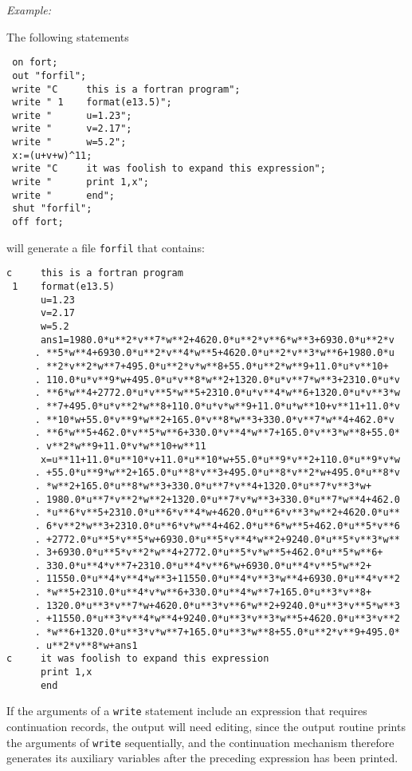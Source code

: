 \textit{Example:}

The following {\REDUCE} statements
\begin{verbatim}
 on fort;
 out "forfil";
 write "C     this is a fortran program";
 write " 1    format(e13.5)";
 write "      u=1.23";
 write "      v=2.17";
 write "      w=5.2";
 x:=(u+v+w)^11;
 write "C     it was foolish to expand this expression";
 write "      print 1,x";
 write "      end";
 shut "forfil";
 off fort;
\end{verbatim}
will generate a file \texttt{forfil} that contains:

{\scriptsize
\begin{verbatim}
c     this is a fortran program
 1    format(e13.5)
      u=1.23
      v=2.17
      w=5.2
      ans1=1980.0*u**2*v**7*w**2+4620.0*u**2*v**6*w**3+6930.0*u**2*v
     . **5*w**4+6930.0*u**2*v**4*w**5+4620.0*u**2*v**3*w**6+1980.0*u
     . **2*v**2*w**7+495.0*u**2*v*w**8+55.0*u**2*w**9+11.0*u*v**10+
     . 110.0*u*v**9*w+495.0*u*v**8*w**2+1320.0*u*v**7*w**3+2310.0*u*v
     . **6*w**4+2772.0*u*v**5*w**5+2310.0*u*v**4*w**6+1320.0*u*v**3*w
     . **7+495.0*u*v**2*w**8+110.0*u*v*w**9+11.0*u*w**10+v**11+11.0*v
     . **10*w+55.0*v**9*w**2+165.0*v**8*w**3+330.0*v**7*w**4+462.0*v
     . **6*w**5+462.0*v**5*w**6+330.0*v**4*w**7+165.0*v**3*w**8+55.0*
     . v**2*w**9+11.0*v*w**10+w**11
      x=u**11+11.0*u**10*v+11.0*u**10*w+55.0*u**9*v**2+110.0*u**9*v*w
     . +55.0*u**9*w**2+165.0*u**8*v**3+495.0*u**8*v**2*w+495.0*u**8*v
     . *w**2+165.0*u**8*w**3+330.0*u**7*v**4+1320.0*u**7*v**3*w+
     . 1980.0*u**7*v**2*w**2+1320.0*u**7*v*w**3+330.0*u**7*w**4+462.0
     . *u**6*v**5+2310.0*u**6*v**4*w+4620.0*u**6*v**3*w**2+4620.0*u**
     . 6*v**2*w**3+2310.0*u**6*v*w**4+462.0*u**6*w**5+462.0*u**5*v**6
     . +2772.0*u**5*v**5*w+6930.0*u**5*v**4*w**2+9240.0*u**5*v**3*w**
     . 3+6930.0*u**5*v**2*w**4+2772.0*u**5*v*w**5+462.0*u**5*w**6+
     . 330.0*u**4*v**7+2310.0*u**4*v**6*w+6930.0*u**4*v**5*w**2+
     . 11550.0*u**4*v**4*w**3+11550.0*u**4*v**3*w**4+6930.0*u**4*v**2
     . *w**5+2310.0*u**4*v*w**6+330.0*u**4*w**7+165.0*u**3*v**8+
     . 1320.0*u**3*v**7*w+4620.0*u**3*v**6*w**2+9240.0*u**3*v**5*w**3
     . +11550.0*u**3*v**4*w**4+9240.0*u**3*v**3*w**5+4620.0*u**3*v**2
     . *w**6+1320.0*u**3*v*w**7+165.0*u**3*w**8+55.0*u**2*v**9+495.0*
     . u**2*v**8*w+ans1
c     it was foolish to expand this expression
      print 1,x
      end
\end{verbatim}
}
If the arguments of a \texttt{write} statement include an expression that
requires continuation records, the output will need editing, since the
output routine prints the arguments of \texttt{write} sequentially, and the
continuation mechanism therefore generates its auxiliary variables after
the preceding expression has been printed.

